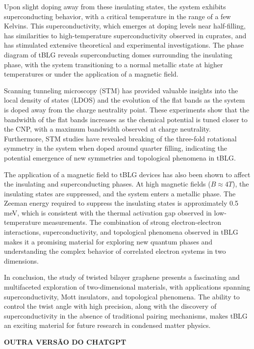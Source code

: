 Upon slight doping away from these insulating states, the system exhibits superconducting behavior, with a critical temperature in the range of a few Kelvins. This superconductivity, which emerges at doping levels near half-filling, has similarities to high-temperature superconductivity observed in cuprates, and has stimulated extensive theoretical and experimental investigations. The phase diagram of tBLG reveals superconducting domes surrounding the insulating phase, with the system transitioning to a normal metallic state at higher temperatures or under the application of a magnetic field.

Scanning tunneling microscopy (STM) has provided valuable insights into the local density of states (LDOS) and the evolution of the flat bands as the system is doped away from the charge neutrality point. These experiments show that the bandwidth of the flat bands increases as the chemical potential is tuned closer to the CNP, with a maximum bandwidth observed at charge neutrality. Furthermore, STM studies have revealed breaking of the three-fold rotational symmetry in the system when doped around quarter filling, indicating the potential emergence of new symmetries and topological phenomena in tBLG.

The application of a magnetic field to tBLG devices has also been shown to affect the insulating and superconducting phases. At high magnetic fields (\(B \approx 4T\)), the insulating states are suppressed, and the system enters a metallic phase. The Zeeman energy required to suppress the insulating states is approximately 0.5 meV, which is consistent with the thermal activation gap observed in low-temperature measurements. The combination of strong electron-electron interactions, superconductivity, and topological phenomena observed in tBLG makes it a promising material for exploring new quantum phases and understanding the complex behavior of correlated electron systems in two dimensions.

In conclusion, the study of twisted bilayer graphene presents a fascinating and multifaceted exploration of two-dimensional materials, with applications spanning superconductivity, Mott insulators, and topological phenomena. The ability to control the twist angle with high precision, along with the discovery of superconductivity in the absence of traditional pairing mechanisms, makes tBLG an exciting material for future research in condensed matter physics.

\n
\textbf{OUTRA VERSÃO DO CHATGPT}
\n

